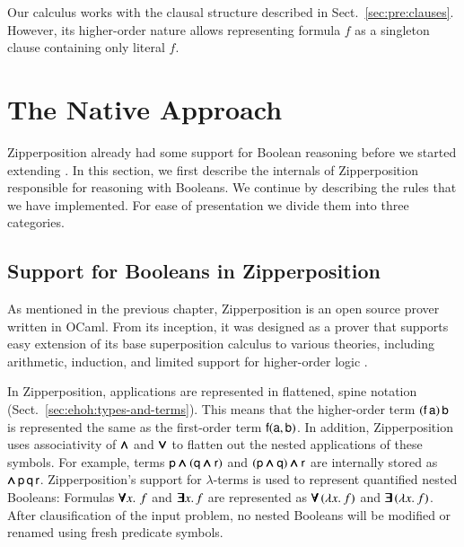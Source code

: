Our calculus works with the clausal structure described in Sect.~\ref{sec:pre:clauses}.
However, its higher-order nature allows representing formula $f$ as a singleton clause
containing only literal $f$.

\section{The Native Approach} 
\label{sect:bool:native}

Zipperposition already had some support for Boolean reasoning before we
started extending \lsup{}. In this section, we first
describe the internals of Zipperposition responsible for reasoning with
Booleans. We continue by describing the rules that we have
implemented. For ease of presentation we divide them into three categories.
\subsection{Support for Booleans in Zipperposition}
\label{subsect:bool:zip-bools}

As mentioned in the previous chapter, Zipperposition is an open source prover
written in OCaml. From its inception, it was designed as a prover that supports
easy extension of its base superposition calculus to various theories, including
arithmetic, induction, and limited support for higher-order logic
\cite{sc-15-simon-phd,sc-supind-17}.

In Zipperposition, applications are represented in flattened, spine notation (Sect.~\ref{sec:ehoh:types-and-terms}).
This means that the higher-order term $(\mathsf{f} \, \mathsf{a}) \, \mathsf{b}$ is
represented the same as the first-order term $\mathsf{f}(\mathsf{a}, \mathsf{b})$. In
addition, Zipperposition uses associativity of $\pmb{\land}$ and $\pmb{\lor}$ to flatten out
the nested applications of these symbols. For example, terms $\mathsf{p} \pmb{\land}
(\mathsf{q} \pmb{\land} \mathsf{r})$ and $(\mathsf{p} \pmb{\land} \mathsf{q}) \pmb{\land} \mathsf{r}$ are
internally stored as $\pmb{\land} \, \mathsf{p} \, \mathsf{q} \, \mathsf{r}$. Zipperposition's
support for $\lambda$-terms is used to represent quantified nested Booleans:
Formulas $\pmb{\forall} x. \, \, f$ and $\pmb{\exists} x. \, f$ are represented as
$\pmb{\forall} \, (\lambda x.\> f)$ and $\pmb{\exists} \, (\lambda x.\> f)$. After clausification of
the input problem, no nested Booleans will be modified or renamed using fresh
predicate symbols.

